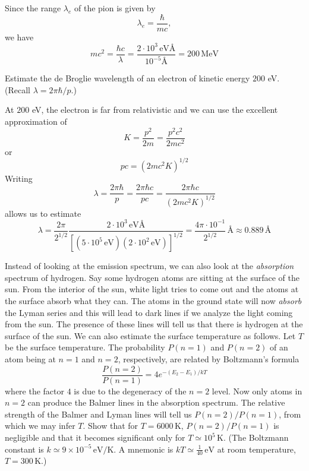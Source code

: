 \documentclass[../principles-of-quantum-mechanics.tex]{subfiles}
\begin{document}
\begin{questions}
	\begin{solution}
		Since the range $\lambda_e$ of the pion is given by
		$$\lambda_e = \frac{\hbar}{mc},$$
		we have
		$$mc^2 = \frac{\hbar c}{\lambda} = \frac{2\cdot 10^3\,\text{eV\AA}}{10^{-5}\text{\AA}} = 200\,\text{MeV}$$
	\end{solution}
	
	\question Estimate the de Broglie wavelength of an electron of kinetic energy $200$ eV. (Recall $\lambda = 2\pi\hbar/p$.)
	
	\begin{solution}
		At $200$ eV, the electron is far from relativistic and we can use the excellent approximation of
		$$K = \frac{p^2}{2m} = \frac{p^2c^2}{2mc^2}$$
		or
		$$pc = (2mc^2K)^{1/2}$$
		Writing
		$$\lambda = \frac{2\pi\hbar}{p} = \frac{2\pi\hbar c}{pc} = \frac{2\pi\hbar c}{(2mc^2K)^{1/2}}$$
		allows us to estimate
		$$\lambda = \frac{2\pi}{2^{1/2}}\frac{2\cdot10^3\,\text{eV\AA}}{[(5\cdot10^5\,\text{eV})(2\cdot10^2\,\text{eV})]^{1/2}} = \frac{4\pi\cdot10^{-1}}{2^{1/2}}\,\text{\AA} \approx 0.889\,\text{\AA}$$
	\end{solution}

	\question Instead of looking at the emission spectrum, we can also look at the \textit{absorption} spectrum of hydrogen. Say some hydrogen atoms are sitting at the surface of the sun. From the interior of the sun, white light tries to come out and the atoms at the surface absorb what they can. The atoms in the ground state will now \textit{absorb} the Lyman series and this will lead to dark lines if we analyze the light coming from the sun. The presence of these lines will tell us that there is hydrogen at the surface of the sun. We can also estimate the surface temperature as follows. Let $T$ be the surface temperature. The probability $P(n = 1)$ and $P(n = 2)$ of an atom being at $n=1$ and $n=2$, respectively, are related by Boltzmann's formula
	$$\frac{P(n=2)}{P(n=1)} = 4e^{-(E_2-E_1)/kT}$$
	where the factor $4$ is due to the degeneracy of the $n=2$ level. Now only atoms in $n = 2$ can produce the Balmer lines in the absorption spectrum. The relative strength of the Balmer and Lyman lines will tell us $P(n = 2)/P(n = 1)$, from which we may infer $T$. Show that for $T = 6000\,\text{K}$, $P(n = 2)/P(n = 1)$ is negligible and that it becomes significant only for $T \simeq 10^5\,\text{K}$. (The Boltzmann constant is $k \simeq 9\times10^{-5}\,\text{eV/K}$. A mnemonic is $kT \simeq \tfrac{1}{40}\,\text{eV}$ at room temperature, $T = 300\,\text{K}$.)
	

\end{questions}
\end{document}

